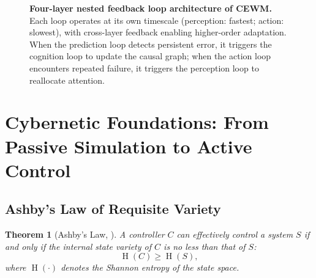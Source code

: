 \documentclass[11pt,a4paper]{article}
\newtheorem{theorem}{Theorem}[section]
\newcommand{\CEWM}{\textsc{CEWM}}
\DeclareMathOperator{\Ent}{H}
\begin{document}
\begin{figure}[H]
{%
}
\caption{\textbf{Four-layer nested feedback loop architecture of \CEWM{}.} Each loop operates at its own timescale (perception: fastest; action: slowest), with cross-layer feedback enabling higher-order adaptation. When the prediction loop detects persistent error, it triggers the cognition loop to update the causal graph; when the action loop encounters repeated failure, it triggers the perception loop to reallocate attention.}\label{fig:four-loops}
\end{figure}

\section{Cybernetic Foundations: From Passive Simulation to Active Control}\label{sec:cybernetics}

\subsection{Ashby's Law of Requisite Variety}

\begin{theorem}[Ashby's Law, \citeyear{ashby1956cybernetics}]\label{thm:ashby}
A controller $C$ can effectively control a system $S$ if and only if the internal state variety of $C$ is no less than that of $S$:
\begin{equation}\label{eq:ashby}
  \Ent(C) \geq \Ent(S),
\end{equation}
where $\Ent(\cdot)$ denotes the Shannon entropy of the state space.
\end{theorem}
\end{document}

